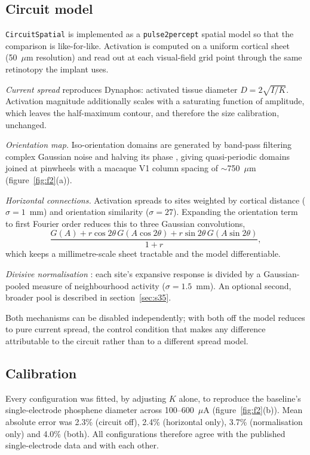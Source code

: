 \documentclass[10pt,twocolumn]{article}
\newcommand{\pptwo}{\texttt{pulse2percept}}
\newcommand{\um}{\ensuremath{\mu\text{m}}}
\newcommand{\uA}{\ensuremath{\mu\text{A}}}
\begin{document}
\subsection{Circuit model}

\texttt{CircuitSpatial} is implemented as a \pptwo{} spatial model so that
the comparison is like-for-like. Activation is computed on a uniform
cortical sheet (50~\um{} resolution) and read out at each visual-field grid
point through the same retinotopy the implant uses.

\textit{Current spread} reproduces Dynaphos: activated tissue diameter
$D = 2\sqrt{I/K}$. Activation magnitude additionally scales with a
saturating function of amplitude, which leaves the half-maximum contour, and
therefore the size calibration, unchanged.

\textit{Orientation map.} Iso-orientation domains are generated by
band-pass filtering complex Gaussian noise and halving its phase
\citep{rojer1990}, giving quasi-periodic domains joined at pinwheels with a
macaque V1 column spacing of $\sim$750~\um{} (figure~\ref{fig:f2}(a)).

\textit{Horizontal connections.} Activation spreads to sites weighted by
cortical distance ($\sigma = 1$~mm) and orientation similarity
($\sigma = 27$\textdegree). Expanding the orientation term to first Fourier
order reduces this to three Gaussian convolutions,
\begin{equation}
  \frac{G(A) + r\cos2\theta\, G(A\cos2\theta) + r\sin2\theta\, G(A\sin2\theta)}
       {1+r},
\end{equation}
which keeps a millimetre-scale sheet tractable and the model
differentiable.

\textit{Divisive normalisation} \citep{carandini2012}: each site's expansive
response is divided by a Gaussian-pooled measure of neighbourhood activity
($\sigma = 1.5$~mm). An optional second, broader pool is described in
section~\ref{sec:s35}.

Both mechanisms can be disabled independently; with both off the model
reduces to pure current spread, the control condition that makes any
difference attributable to the circuit rather than to a different spread
model.

\subsection{Calibration}

Every configuration was fitted, by adjusting $K$ alone, to reproduce the
baseline's single-electrode phosphene diameter across 100--600~\uA{}
(figure~\ref{fig:f2}(b)). Mean absolute error was 2.3\% (circuit off), 2.4\%
(horizontal only), 3.7\% (normalisation only) and 4.0\% (both). All
configurations therefore agree with the published single-electrode data and
with each other.
\end{document}
